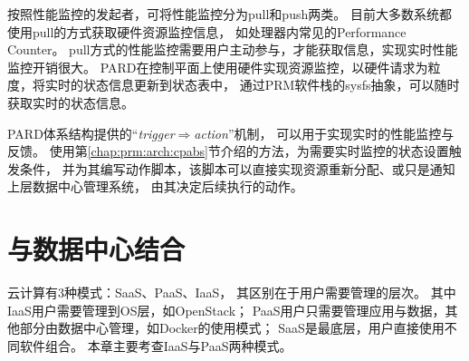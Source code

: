 按照性能监控的发起者，可将性能监控分为pull和push两类。
目前大多数系统都使用pull的方式获取硬件资源监控信息，
如处理器内常见的Performance Counter。
pull方式的性能监控需要用户主动参与，才能获取信息，实现实时性能监控开销很大。
PARD在控制平面上使用硬件实现资源监控，以硬件请求为粒度，将实时的状态信息更新到状态表中，
通过PRM软件栈的sysfs抽象，可以随时获取实时的状态信息。

PARD体系结构提供的``\emph{trigger$\Rightarrow$action}''机制，
可以用于实现实时的性能监控与反馈。
使用第\ref{chap:prm:arch:cpabs}节介绍的方法，为需要实时监控的状态设置触发条件，
并为其编写动作脚本，该脚本可以直接实现资源重新分配、或只是通知上层数据中心管理系统，
由其决定后续执行的动作。



\section{与数据中心结合}

云计算有3种模式：SaaS、PaaS、IaaS，%
其区别在于用户需要管理的层次。
其中IaaS用户需要管理到OS层，如OpenStack；
PaaS用户只需要管理应用与数据，其他部分由数据中心管理，如Docker的使用模式；
SaaS是最底层，用户直接使用不同软件组合。
本章主要考查IaaS与PaaS两种模式。


